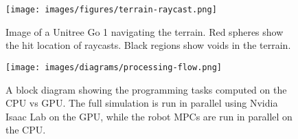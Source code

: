\begin{figure}
  \centering
  \texttt{[image: images/figures/terrain-raycast.png]}
  \caption{Image of a Unitree Go 1 navigating the terrain. Red
    spheres show the hit location of raycasts. Black regions show voids
  in the terrain.}
  \label{fig:figure-terrain-raycast}
\end{figure}

\begin{figure}
  \centering
  \texttt{[image: images/diagrams/processing-flow.png]}
  \caption{A block diagram showing the programming tasks computed on
    the CPU vs GPU. The full simulation is run in parallel using Nvidia
  Isaac Lab on the GPU, while the robot MPCs are run in parallel on the CPU.}
  \label{fig:diagram-processing-flow}
\end{figure}
